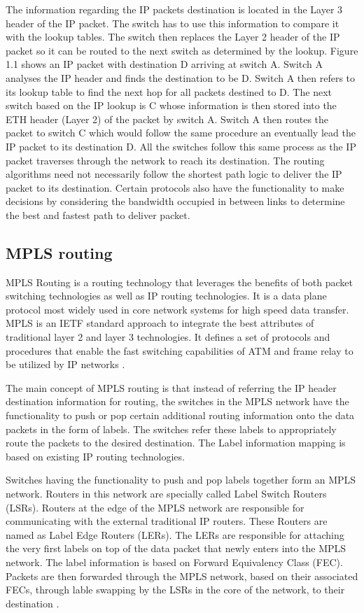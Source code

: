 The information regarding the IP packets destination is located in the Layer 3 header of the IP packet. The switch has to use this information to compare it with the lookup tables. The switch then replaces the Layer 2 header of the IP packet so it can be routed to the next switch as determined by the lookup. Figure 1.1 shows an IP packet with destination D arriving at switch A. Switch A analyses the IP header and finds the destination to be D. Switch A then refers to its lookup table to find the next hop for all packets destined to D. The next switch based on the IP lookup is C whose information is then stored into the ETH header (Layer 2) of the packet by switch A. Switch A then routes the packet to switch C which would follow the same procedure an eventually lead the IP packet to its destination D. 
	All the switches follow this same process as the IP packet traverses through the network to reach its destination. The routing algorithms need not necessarily follow the shortest path logic to deliver the IP packet to its destination. Certain protocols also have the functionality to make decisions by considering the bandwidth occupied in between links to determine the best and fastest path to deliver packet.

\subsection{MPLS routing}
MPLS Routing is a routing technology that leverages the benefits of both packet switching technologies as well as IP routing technologies. It is a data plane protocol most widely used in core network systems for high speed data transfer. MPLS is an IETF standard approach to integrate the best attributes of traditional layer 2 and layer 3 technologies. It defines a set of protocols and procedures that enable the fast switching capabilities of ATM and frame relay to be utilized by IP networks \cite{pise2005packet}.

The main concept of MPLS routing is that instead of referring the IP header destination information for routing, the switches in the MPLS network have the functionality to push or pop certain additional routing information onto the data packets in the form of labels. The switches refer these labels to appropriately route the packets to the desired destination. The Label information mapping is based on existing IP routing technologies.

Switches having the functionality to push and pop labels together form an MPLS network. Routers in this network are specially called Label Switch Routers (LSRs). Routers at the edge of the MPLS network are responsible for communicating with the external traditional IP routers. These Routers are named as Label Edge Routers (LERs). The LERs are responsible for attaching the very first labels on top of the data packet that newly enters into the MPLS network. The label information is based on Forward Equivalency Class (FEC). Packets are then forwarded through the MPLS network, based on their associated FECs, through lable swapping by the LSRs in the core of the network, to their destination \cite{pise2005packet}.

